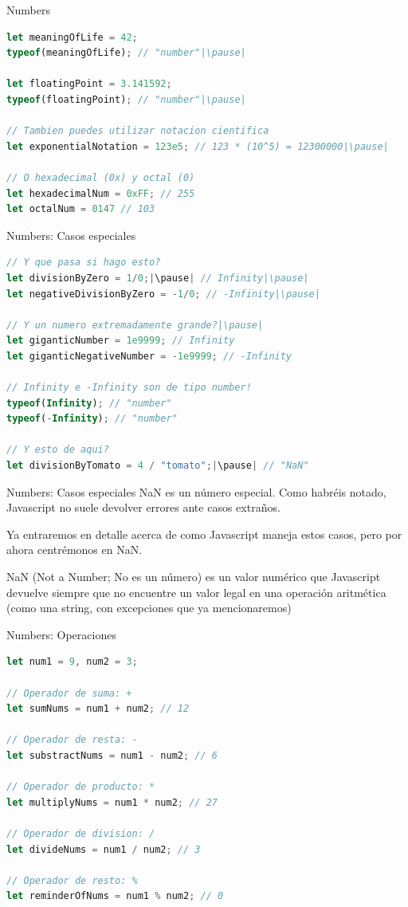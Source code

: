 \documentclass{beamer}
\begin{document}
\begin{frame}[fragile]{Numbers}
\begin{lstlisting}[language=JavaScript]
let meaningOfLife = 42;
typeof(meaningOfLife); // "number"|\pause|

let floatingPoint = 3.141592;
typeof(floatingPoint); // "number"|\pause|

// Tambien puedes utilizar notacion cientifica
let exponentialNotation = 123e5; // 123 * (10^5) = 12300000|\pause|

// O hexadecimal (0x) y octal (0)
let hexadecimalNum = 0xFF; // 255
let octalNum = 0147 // 103
\end{lstlisting}    
\end{frame}

\begin{frame}[fragile]{Numbers: Casos especiales}
\begin{lstlisting}[language=JavaScript]
// Y que pasa si hago esto?
let divisionByZero = 1/0;|\pause| // Infinity|\pause|
let negativeDivisionByZero = -1/0; // -Infinity|\pause|

// Y un numero extremadamente grande?|\pause|
let giganticNumber = 1e9999; // Infinity
let giganticNegativeNumber = -1e9999; // -Infinity

// Infinity e -Infinity son de tipo number!
typeof(Infinity); // "number"
typeof(-Infinity); // "number"

// Y esto de aqui?
let divisionByTomato = 4 / "tomato";|\pause| // "NaN"
\end{lstlisting}    
\end{frame}

\begin{frame}{Numbers: Casos especiales}
NaN es un número especial. Como habréis notado, Javascript no suele devolver errores ante casos extraños.

Ya entraremos en detalle acerca de como Javascript maneja estos casos, pero por ahora centrémonos en NaN.\pause

NaN (Not a Number; No es un número) es un valor numérico que Javascript devuelve siempre que no encuentre un valor legal en una operación aritmética (como una string, con excepciones que ya mencionaremos)
\end{frame}

\begin{frame}[fragile]{Numbers: Operaciones}
\begin{lstlisting}[language=JavaScript]
let num1 = 9, num2 = 3;

// Operador de suma: +
let sumNums = num1 + num2; // 12

// Operador de resta: -
let substractNums = num1 - num2; // 6

// Operador de producto: *
let multiplyNums = num1 * num2; // 27

// Operador de division: /
let divideNums = num1 / num2; // 3

// Operador de resto: %
let reminderOfNums = num1 % num2; // 0
\end{lstlisting}
\end{frame}
\end{document}
